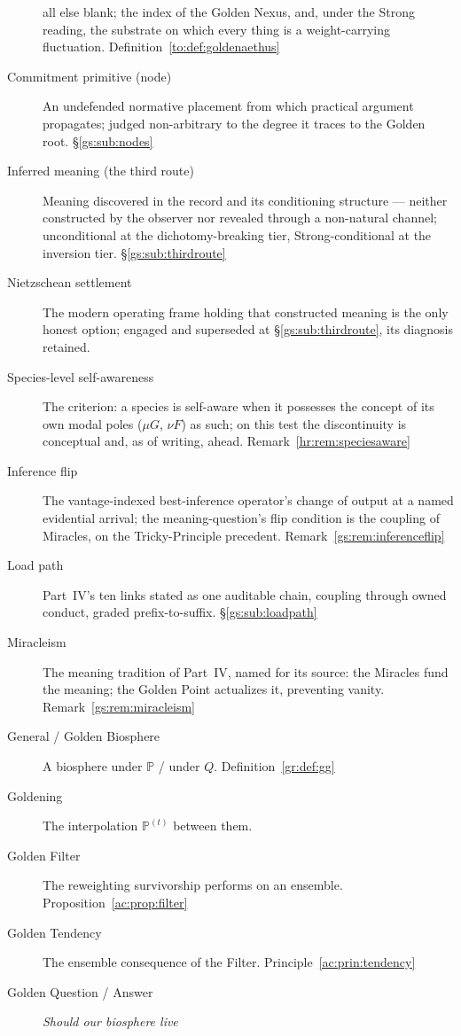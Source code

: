 \documentclass[11pt]{article}
\numberwithin{equation}{section}
\theoremstyle{plain}
\theoremstyle{definition}
\theoremstyle{remark}
\newcommand{\PP}{\mathbb{P}}
\begin{document}
\begin{description}
all else blank; the index of the Golden Nexus, and, under the
Strong reading, the substrate on which every thing is a
weight-carrying fluctuation. Definition~\ref{to:def:goldenaethus}
\item[Commitment primitive (node)] An undefended normative placement
from which practical argument propagates; judged non-arbitrary to the
degree it traces to the Golden root. \S\ref{gs:sub:nodes}
\item[Inferred meaning (the third route)] Meaning discovered in the
record and its conditioning structure --- neither constructed by the
observer nor revealed through a non-natural channel; unconditional at
the dichotomy-breaking tier, Strong-conditional at the inversion
tier. \S\ref{gs:sub:thirdroute}
\item[Nietzschean settlement] The modern operating frame holding that
constructed meaning is the only honest option; engaged and superseded
at \S\ref{gs:sub:thirdroute}, its diagnosis retained.
\item[Species-level self-awareness] The criterion: a species is
self-aware when it possesses the concept of its own modal poles
($\mu G$, $\nu F$) as such; on this test the discontinuity is
conceptual and, as of writing, ahead.
Remark~\ref{hr:rem:speciesaware}
\item[Inference flip] The vantage-indexed best-inference operator's
change of output at a named evidential arrival; the meaning-question's
flip condition is the coupling of Miracles, on the Tricky-Principle
precedent. Remark~\ref{gs:rem:inferenceflip}
\item[Load path] Part~IV's ten links stated as one auditable chain,
coupling through owned conduct, graded prefix-to-suffix.
\S\ref{gs:sub:loadpath}
\item[Miracleism] The meaning tradition of Part~IV, named for its
source: the Miracles fund the meaning; the Golden Point actualizes
it, preventing vanity. Remark~\ref{gs:rem:miracleism}
\item[General / Golden Biosphere] A biosphere under $\PP$ / under $Q$.
Definition~\ref{gr:def:gg}
\item[Goldening] The interpolation $\PP^{(t)}$ between them.
\item[Golden Filter] The reweighting survivorship performs on an
ensemble. Proposition~\ref{ac:prop:filter}
\item[Golden Tendency] The ensemble consequence of the Filter.
Principle~\ref{ac:prin:tendency}
\item[Golden Question / Answer] \emph{Should our biosphere live
}
\end{description}
\end{document}
